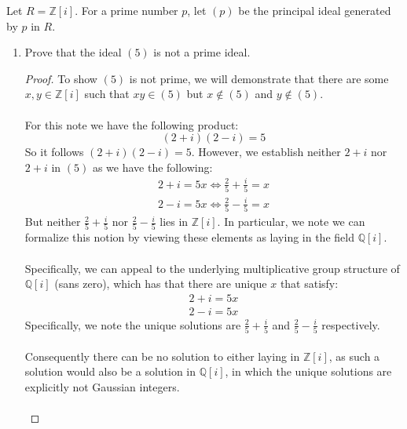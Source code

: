 \documentclass[12pt]{article}
\newenvironment{ex}[2][Exercise]{\begin{trivlist}
\item[\hskip \labelsep {\bfseries #1}\hskip \labelsep {\bfseries #2.}]}{\end{trivlist}}
\begin{document}
\begin{ex}{3}
    Let $R = \mathbb{Z}[i]$. For a prime number $p$, let $(p)$ be the principal ideal generated by $p$ in $R$.
    \begin{enumerate}[label=(\alph*)]
        \item Prove that the ideal $(5)$ is not a prime ideal.
        \begin{proof}
            To show $(5)$ is not prime, we will demonstrate that there are some $x, y \in \mathbb{Z}[i]$ such that $xy \in (5)$ but $x \notin (5)$ and $y \notin (5)$.
            \\ \\ For this note we have the following product:
            \begin{equation}
                (2 + i)(2 - i) = 5
            \end{equation}
            So it follows $(2 + i)(2 - i) = 5$. However, we establish neither $2 + i$ nor $2 + i$ in $(5)$ as we have the following:
            \begin{equation}
                \begin{aligned}
                    2 + i = 5x \Leftrightarrow \frac{2}{5} + \frac{i}{5} = x \\
                    2 - i = 5x \Leftrightarrow \frac{2}{5} - \frac{i}{5} = x
                \end{aligned}
            \end{equation}
            But neither $\frac{2}{5} + \frac{i}{5}$ nor $\frac{2}{5} - \frac{i}{5}$ lies in $\mathbb{Z}[i]$. In particular, we note we can formalize this notion by viewing these elements as laying in the field $\mathbb{Q}[i]$. \\ \\
            Specifically, we can appeal to the underlying multiplicative group structure of $\mathbb{Q}[i]$ (sans zero), which has that there are unique $x$ that satisfy:
            \begin{equation}
                \begin{aligned}
                    2 + i = 5x \\
                    2 - i = 5x
                \end{aligned}
            \end{equation}
            Specifically, we note the unique solutions are $\frac{2}{5} + \frac{i}{5}$ and $\frac{2}{5} - \frac{i}{5}$ respectively. \\ \\ Consequently there can be no solution to either laying in $\mathbb{Z}[i]$, as such a solution would also be a solution in $\mathbb{Q}[i]$, in which the unique solutions are explicitly not Gaussian integers. \\ \\

\end{proof}
\end{enumerate}
\end{ex}
\end{document}
